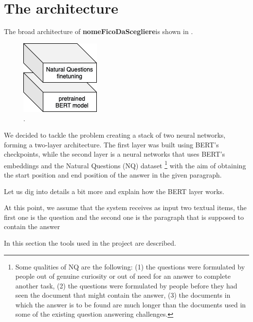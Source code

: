 \documentclass[12pt,a4paper,hidelinks]{article}
\newcommand{\nomefico}{\textbf{nomeFicoDaScegliere}}
\begin{document}
\section{The architecture}\label{sec:model}
The broad architecture of \nomefico is shown in .

\begin{figure}[ht!]
    \centering
    \includegraphics[scale=.9]{pics/broad_architecture.png}
    \caption{.}
    \label{fig:broad_architecture}
\end{figure}

We decided to tackle the problem creating a stack of two neural networks, forming a two-layer architecture. The first layer was built using BERT's \cite{devlin2018bert} checkpoints, while the second layer is a neural networks that uses BERT's embeddings and the Natural Questions (NQ) \cite{kwiatowski} dataset \footnote{Some qualities of NQ are the following: (1) the questions were formulated by people out of genuine curiosity or out of need for an answer to complete another task, (2) the questions were formulated by people before they had seen the document that might contain the answer, (3) the documents in which the answer is to be found are much longer than the documents used in some of the existing question answering challenges.} with the aim of obtaining the start position and end position of the answer in the given paragraph.

Let us dig into details a bit more and explain how the BERT layer works.



At this point, we assume that the system receives as input two textual items, the first one is the question and the second one is the paragraph that is supposed to contain the answer


In this section the tools used in the project are described.

\end{document}
